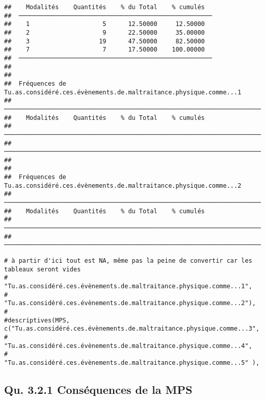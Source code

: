 \documentclass[
]{article}
\begin{document}
\begin{verbatim}
##    Modalités    Quantités    % du Total    % cumulés   
##  ───────────────────────────────────────────────────── 
##    1                    5      12.50000     12.50000   
##    2                    9      22.50000     35.00000   
##    3                   19      47.50000     82.50000   
##    7                    7      17.50000    100.00000   
##  ───────────────────────────────────────────────────── 
## 
## 
##  Fréquences de Tu.as.considéré.ces.évènements.de.maltraitance.physique.comme...1 
##  ─────────────────────────────────────────────────────────────────────────────── 
##    Modalités    Quantités    % du Total    % cumulés   
##  ─────────────────────────────────────────────────────────────────────────────── 
##  ─────────────────────────────────────────────────────────────────────────────── 
## 
## 
##  Fréquences de Tu.as.considéré.ces.évènements.de.maltraitance.physique.comme...2 
##  ─────────────────────────────────────────────────────────────────────────────── 
##    Modalités    Quantités    % du Total    % cumulés   
##  ─────────────────────────────────────────────────────────────────────────────── 
##  ───────────────────────────────────────────────────────────────────────────────
\end{verbatim}

\begin{verbatim}
# à partir d'ici tout est NA, même pas la peine de convertir car les tableaux seront vides 
#                    "Tu.as.considéré.ces.évènements.de.maltraitance.physique.comme...1",
#                    "Tu.as.considéré.ces.évènements.de.maltraitance.physique.comme...2"), 
#
#descriptives(MPS, c("Tu.as.considéré.ces.évènements.de.maltraitance.physique.comme...3", 
#                    "Tu.as.considéré.ces.évènements.de.maltraitance.physique.comme...4",
#                    "Tu.as.considéré.ces.évènements.de.maltraitance.physique.comme...5" ),
\end{verbatim}

\hypertarget{qu.-3.2.1-consuxe9quences-de-la-mps}{%
\subsection{Qu. 3.2.1 Conséquences de la
MPS}\label{qu.-3.2.1-consuxe9quences-de-la-mps}}
\end{document}
